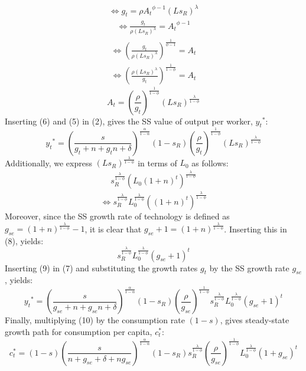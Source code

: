 \documentclass[11pt]{article} %
\begin{document}
\begin{align*}
    \Longleftrightarrow g_t = {\rho}{A_t}^{\phi-1}(Ls_R)^{\lambda}
\end{align*}
\begin{align*}
    \Longleftrightarrow \frac{g_t}{\rho(Ls_R)^{\lambda}} = {A_t}^{\phi-1}
\end{align*}
\begin{align*}
    \Longleftrightarrow \left(\frac{g_t}{\rho(Ls_R)^{\lambda}}\right)^{\frac{1}{\phi-1}} = {A_t}
\end{align*}
\begin{align*}
    \Longleftrightarrow\left(\frac{\rho(Ls_R)^{\lambda}}{g_t}\right)^{\frac{1}{1-\phi}} = {A_t}
\end{align*}
\begin{equation}
    A_t=\left(\frac{\rho}{g_t}\right)^{\frac{1}{1-\phi}}(Ls_R)^{\frac{\lambda}{1-\phi}}
\end{equation}
Inserting (6) and (5) in (2), gives the SS value of output per worker, ${y_t}^*$:
\begin{equation}
    {y_t}^* = \left(\frac{s}{g_t+n+g_tn+\delta}\right)^{\frac{\alpha}{1-\alpha}}(1-s_R) \left(\frac{\rho}{g_t}\right)^{\frac{1}{1-\phi}}(Ls_R)^{\frac{\lambda}{1-\phi}}
\end{equation}
Additionally, we express $(Ls_R)^{\frac{\lambda}{1-\phi}}$ in terms of $L_0$ as follows:
\begin{align*}
    s_R^{\frac{\lambda}{1-\phi}}\left(L_0(1+n)^{t}\right)^{\frac{\lambda}{1-\phi}}
\end{align*}
\begin{equation}
    \Longleftrightarrow s_R^{\frac{\lambda}{1-\phi}}L_0^{\frac{\lambda}{1-\phi}}\left((1+n)^{t}\right)^{\frac{\lambda}{1-\phi}}
\end{equation}
Moreover, since the SS growth rate of technology is defined as $g_{se}=(1+n)^{\frac{\lambda}{1-\phi}}-1$, it is clear that $g_{se}+1=(1+n)^{\frac{\lambda}{1-\phi}}$. Inserting this in (8), yields:
\begin{equation}
    s_R^{\frac{\lambda}{1-\phi}}L_0^{\frac{\lambda}{1-\phi}}(g_{se}+1)^t
\end{equation}
Inserting (9) in (7) and substituting the growth rates $g_t$ by the SS growth rate $g_{se}$, yields:
\begin{equation}
    {y_t}^* = \left(\frac{s}{g_{se}+n+g_{se}n+\delta}\right)^{\frac{\alpha}{1-\alpha}}(1-s_R) \left(\frac{\rho}{g_{se}}\right)^{\frac{1}{1-\phi}}s_R^{\frac{\lambda}{1-\phi}}L_0^{\frac{\lambda}{1-\phi}}(g_{se}+1)^t
\end{equation}
Finally, multiplying (10) by the consumption rate $(1-s)$, gives steady-state growth path for consumption per capita, $c_t^*$:
\begin{equation}
    c_t^* = (1-s)\left(\frac{s}{n+g_{se}+\delta+ng_{se}}\right)^{\frac{\alpha}{1-\alpha}}(1-s_{R})s_R^{\frac{\lambda}{1-\phi}}\left(\frac{\rho}{g_{se}} \right)^{\frac{1}{1-\phi}}L_0^{\frac{\lambda}{1-\phi}}(1+g_{se})^t
\end{equation}
\end{document}
